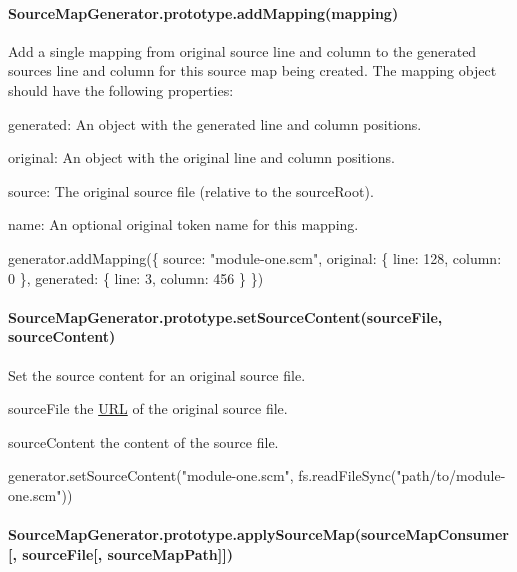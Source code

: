 \paragraph*{Source\+Map\+Generator.\+prototype.\+add\+Mapping(mapping)}

Add a single mapping from original source line and column to the generated source\textquotesingle{}s line and column for this source map being created. The mapping object should have the following properties\+:


\begin{DoxyItemize}
\item {\ttfamily generated}\+: An object with the generated line and column positions.
\item {\ttfamily original}\+: An object with the original line and column positions.
\item {\ttfamily source}\+: The original source file (relative to the source\+Root).
\item {\ttfamily name}\+: An optional original token name for this mapping.
\end{DoxyItemize}


\begin{DoxyCode}
generator.addMapping(\{
  source: "module-one.scm",
  original: \{ line: 128, column: 0 \},
  generated: \{ line: 3, column: 456 \}
\})
\end{DoxyCode}


\paragraph*{Source\+Map\+Generator.\+prototype.\+set\+Source\+Content(source\+File, source\+Content)}

Set the source content for an original source file.


\begin{DoxyItemize}
\item {\ttfamily source\+File} the \mbox{\hyperlink{namespace_u_r_l}{U\+RL}} of the original source file.
\item {\ttfamily source\+Content} the content of the source file.
\end{DoxyItemize}


\begin{DoxyCode}
generator.setSourceContent("module-one.scm",
                           fs.readFileSync("path/to/module-one.scm"))
\end{DoxyCode}


\paragraph*{Source\+Map\+Generator.\+prototype.\+apply\+Source\+Map(source\+Map\+Consumer\mbox{[}, source\+File\mbox{[}, source\+Map\+Path\mbox{]}\mbox{]})}

